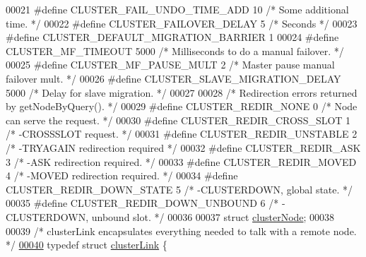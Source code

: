 \begin{DoxyCode}
00021 \textcolor{preprocessor}{#}\textcolor{preprocessor}{define} \textcolor{preprocessor}{CLUSTER\_FAIL\_UNDO\_TIME\_ADD} 10 \textcolor{comment}{/* Some additional time. */}
00022 \textcolor{preprocessor}{#}\textcolor{preprocessor}{define} \textcolor{preprocessor}{CLUSTER\_FAILOVER\_DELAY} 5 \textcolor{comment}{/* Seconds */}
00023 \textcolor{preprocessor}{#}\textcolor{preprocessor}{define} \textcolor{preprocessor}{CLUSTER\_DEFAULT\_MIGRATION\_BARRIER} 1
00024 \textcolor{preprocessor}{#}\textcolor{preprocessor}{define} \textcolor{preprocessor}{CLUSTER\_MF\_TIMEOUT} 5000 \textcolor{comment}{/* Milliseconds to do a manual failover. */}
00025 \textcolor{preprocessor}{#}\textcolor{preprocessor}{define} \textcolor{preprocessor}{CLUSTER\_MF\_PAUSE\_MULT} 2 \textcolor{comment}{/* Master pause manual failover mult. */}
00026 \textcolor{preprocessor}{#}\textcolor{preprocessor}{define} \textcolor{preprocessor}{CLUSTER\_SLAVE\_MIGRATION\_DELAY} 5000 \textcolor{comment}{/* Delay for slave migration. */}
00027 
00028 \textcolor{comment}{/* Redirection errors returned by getNodeByQuery(). */}
00029 \textcolor{preprocessor}{#}\textcolor{preprocessor}{define} \textcolor{preprocessor}{CLUSTER\_REDIR\_NONE} 0          \textcolor{comment}{/* Node can serve the request. */}
00030 \textcolor{preprocessor}{#}\textcolor{preprocessor}{define} \textcolor{preprocessor}{CLUSTER\_REDIR\_CROSS\_SLOT} 1    \textcolor{comment}{/* -CROSSSLOT request. */}
00031 \textcolor{preprocessor}{#}\textcolor{preprocessor}{define} \textcolor{preprocessor}{CLUSTER\_REDIR\_UNSTABLE} 2      \textcolor{comment}{/* -TRYAGAIN redirection required */}
00032 \textcolor{preprocessor}{#}\textcolor{preprocessor}{define} \textcolor{preprocessor}{CLUSTER\_REDIR\_ASK} 3           \textcolor{comment}{/* -ASK redirection required. */}
00033 \textcolor{preprocessor}{#}\textcolor{preprocessor}{define} \textcolor{preprocessor}{CLUSTER\_REDIR\_MOVED} 4         \textcolor{comment}{/* -MOVED redirection required. */}
00034 \textcolor{preprocessor}{#}\textcolor{preprocessor}{define} \textcolor{preprocessor}{CLUSTER\_REDIR\_DOWN\_STATE} 5    \textcolor{comment}{/* -CLUSTERDOWN, global state. */}
00035 \textcolor{preprocessor}{#}\textcolor{preprocessor}{define} \textcolor{preprocessor}{CLUSTER\_REDIR\_DOWN\_UNBOUND} 6  \textcolor{comment}{/* -CLUSTERDOWN, unbound slot. */}
00036 
00037 \textcolor{keyword}{struct} \hyperlink{structclusterNode}{clusterNode};
00038 
00039 \textcolor{comment}{/* clusterLink encapsulates everything needed to talk with a remote node. */}
\hyperlink{structclusterLink}{00040} \textcolor{keyword}{typedef} \textcolor{keyword}{struct} \hyperlink{structclusterLink}{clusterLink} \{

\end{DoxyCode}
